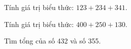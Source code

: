 \begin{ex}
Tính giá trị biểu thức: $123 + 234 + 341$.
\end{ex}

\begin{ex}
Tính giá trị biểu thức: $400 + 250 + 130$.
\end{ex}

\begin{ex}
Tìm tổng của số 432 và số 355.
\end{ex}
